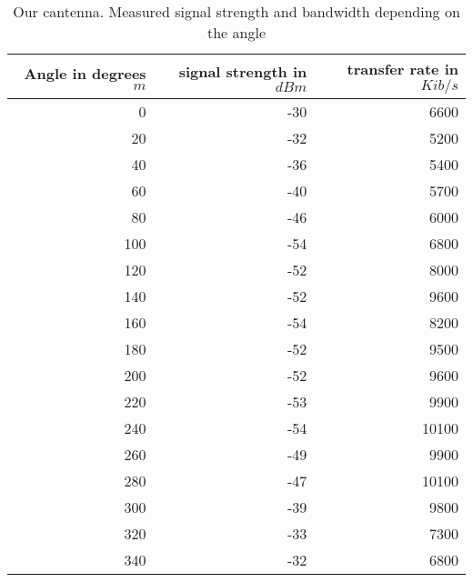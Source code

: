 \begin{table}
	\begin{center}
		\begin{tabular}{r|r|r}\
			Angle in degrees $m$ & signal strength in $dBm$ & transfer rate in $Kib/s$\\
			\hline 
			0 & -30 & 6600\\
			20 & -32 & 5200\\
			40 & -36 & 5400\\
			60 & -40 & 5700\\
			80 & -46 & 6000\\
			100 & -54 & 6800\\
			120 & -52 & 8000\\
			140 & -52 & 9600\\
			160 & -54 & 8200\\
			180 & -52 & 9500\\
			200 & -52 & 9600\\
			220 & -53 & 9900\\
			240 & -54 & 10100\\
			260 & -49 & 9900\\
			280 & -47 & 10100\\
			300 & -39 & 9800\\
			320 & -33 & 7300\\
			340 & -32 & 6800\\
		\end{tabular}
	\end{center}
	\caption{Our cantenna. Measured signal strength and bandwidth depending on the angle}
	\label{ang:can}
\end{table}

